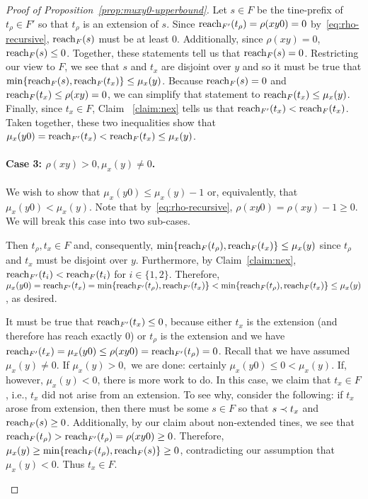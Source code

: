 \begin{proof}[Proof of Proposition~\ref{prop:muxy0-upperbound}]
    Let $s \in F$ be the tine-prefix of $t_\rho \in F'$ so that 
    $t_\rho$ is an extension of $s$. 
    Since $\operatorname{reach}_{F'}(t_\rho) = \rho(xy0) = 0$ by~\eqref{eq:rho-recursive}, 
    $\operatorname{reach}_F(s)$ must be at least 0. 
    Additionally, since $\rho(xy)=0$, $\operatorname{reach}_F(s) \leq 0$. 
    Together, these statements tell us that $\operatorname{reach}_F(s)=0$. 
    Restricting our view to $F$, we see that 
    $s$ and $t_x$ are disjoint over $y$ and 
    so it must be true that 
    $\min\{\operatorname{reach}_F(s),\operatorname{reach}_F(t_x)\} \leq \mu_x(y)$. 
    Because $\operatorname{reach}_F(s)=0$ and $\operatorname{reach}_F(t_x) \leq \rho(xy)=0$, we can simplify that statement to $\operatorname{reach}_F(t_x) \leq \mu_x(y)$. 
    Finally, since $t_x \in F$, 
    Claim ~\ref{claim:nex} tells us that 
    $\operatorname{reach}_{F'}(t_x) < \operatorname{reach}_F(t_x)$. 
    Taken together, these two inequalities show that 
    $\mu_x(y0) = \operatorname{reach}_{F'}(t_x) < \operatorname{reach}_F(t_x) \leq \mu_x(y)$. 


  \paragraph{Case 3: $\rho(xy)>0,\mu_x(y)\neq0$.}
    We wish to show that $\mu_x(y0) \leq \mu_x(y) - 1$ 
    or, equivalently, that $\mu_x(y0) < \mu_x(y)$. 
    Note that by~\ref{eq:rho-recursive}, 
    $\rho(xy0) = \rho(xy) - 1 \geq 0$.
    We will break this case into two sub-cases. 
    \begin{description}[font=\normalfont\itshape\space]
      \item[If both $t_\rho, t_x \in F$.] 
      Then  $t_\rho, t_x \in F$ and, consequently, 
      $\min\{\operatorname{reach}_F(t_\rho),\operatorname{reach}_F(t_x)\} \leq \mu_x(y)$ since $t_\rho$ and $t_x$ must be disjoint over $y$. 
      Furthermore, by Claim~\ref{claim:nex}, 
      $\operatorname{reach}_{F'}(t_i)<\operatorname{reach}_F(t_i)$ for $i\in\{1,2\}$. 
      Therefore, 
      $\mu_x(y0) 
      = \operatorname{reach}_{F'}(t_x) 
      = \min\{\operatorname{reach}_{F'}(t_\rho),\operatorname{reach}_{F'}(t_x)\} 
      < \min\{\operatorname{reach}_{F}(t_\rho),\operatorname{reach}_{F}(t_x)\} 
      \leq\mu_x(y)$, as desired. 

      \item[If either $t_\rho \not \in F$ or $t_x \not \in F$.]
      It must be true that $\operatorname{reach}_{F'}(t_x)\leq 0$, because either $t_x$ is the extension (and therefore has reach exactly 0) or $t_\rho$ is the extension and we have $\operatorname{reach}_{F'}(t_x)=\mu_x(y0)\leq\rho(xy0)=\operatorname{reach}_{F'}(t_\rho)=0$. Recall that we have assumed $\mu_x(y)\neq0$. If $\mu_x(y)>0,$ we are done: certainly $\mu_x(y0)\leq0<\mu_x(y)$. If, however, $\mu_x(y)<0$, there is more work to do. 
      In this case, we claim that $t_x \in F$, i.e., $t_x$ did not arise from an extension. 
      To see why, consider the following: if $t_x$ arose from extension, then there must be some $s \in F$ 
      so that $s \prec t_x$ and $\operatorname{reach}_F(s) \geq 0$. Additionally, by our claim about non-extended tines, we see that 
      $\operatorname{reach}_F(t_\rho)>\operatorname{reach}_{F'}(t_\rho) = \rho(xy0) \geq 0$. 
      Therefore, 
      $\mu_x(y) \geq \min\{\operatorname{reach}_F(t_\rho), \operatorname{reach}_F(s)\} \geq 0$, 
      contradicting our assumption that $\mu_x(y) < 0$. 
      Thus $t_x \in F$. 


\end{description}
\end{proof}
